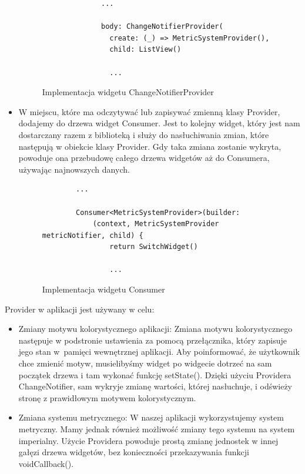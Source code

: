 \documentclass[a4paper,twoside,12pt]{book}
\begin{document}
\begin{itemize}
\begin{figure}[H]
\begin{lstlisting}
              ...
              
              body: ChangeNotifierProvider(
                create: (_) => MetricSystemProvider(),
                child: ListView()

                ...
        \end{lstlisting}
    \caption{Implementacja widgetu ChangeNotifierProvider}
    \label{fig:pseudokod:listings}
    \end{figure}
    \item W miejscu, które ma odczytywać lub zapisywać zmienną klasy Provider, dodajemy do drzewa widget Consumer. Jest to kolejny widget, który jest nam dostarczany razem z biblioteką i służy do nasłuchiwania zmian, które następują w obiekcie klasy Provider. Gdy taka zmiana zostanie wykryta, powoduje ona przebudowę całego drzewa widgetów aż do Consumera, używając najnowszych danych.
    \begin{figure}[H]
        \begin{lstlisting}
        ...
        
        Consumer<MetricSystemProvider>(builder:
            (context, MetricSystemProvider metricNotifier, child) {
                return SwitchWidget()

                ...
        \end{lstlisting}
    \caption{Implementacja widgetu Consumer}
    \label{fig:pseudokod:listings}
    \end{figure}
\end{itemize}

Provider w aplikacji jest używany w celu:
\begin{itemize}
    \item Zmiany motywu kolorystycznego aplikacji: Zmiana motywu kolorystycznego następuje w podstronie ustawienia za pomocą przełącznika, który zapisuje jego stan w~pamięci wewnętrznej aplikacji. Aby poinformować, że użytkownik chce zmienić motyw, musielibyśmy widget po widgecie dotrzeć na sam początek drzewa i tam wykonać funkcję setState(). Dzięki użyciu Providera ChangeNotifier, sam wykryje zmianę wartości, której nasłuchuje, i odświeży stronę z prawidłowym motywem kolorystycznym. 
    \item Zmiana systemu metrycznego: W naszej aplikacji wykorzystujemy system metryczny. Mamy jednak również możliwość zmiany tego systemu na system imperialny. Użycie Providera powoduje prostą zmianę jednostek w innej gałęzi drzewa widgetów, bez konieczności przekazywania funkcji voidCallback().
\end{itemize}
\end{document}
